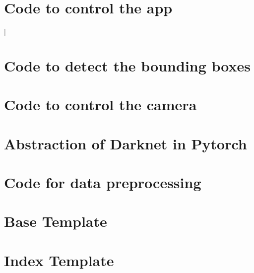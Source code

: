 \section{Code to control the app}]\label{ap:app}


\section{Code to detect the bounding boxes}\label{ap:bbox}


\section{Code to control the camera}\label{ap:camera}


\section{Abstraction of Darknet in Pytorch}\label{ap:darknet}


\section{Code for data preprocessing}\label{ap:preprocess}


\section{Base Template}\label{ap:template1}


\section{Index Template}\label{ap:template2}

